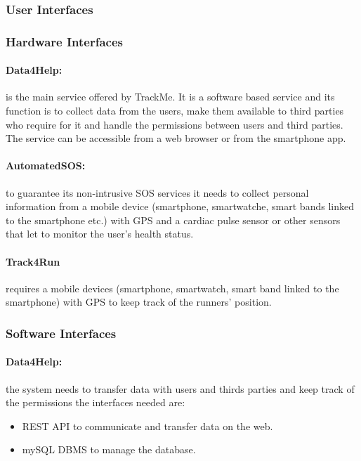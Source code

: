 \documentclass[a4paper]{article}
\begin{document}
    \subsubsection{User Interfaces}
    
    
    
    \subsubsection{Hardware Interfaces}
    
    \paragraph{Data4Help:} is the main service offered by TrackMe. It is a software based service and its function is to collect data from the users, make them available to third parties who require for it and handle the permissions between users and third parties. The service can be accessible from a web browser or from the smartphone app.
    
    \paragraph{AutomatedSOS:} to guarantee its non-intrusive SOS services it needs to collect personal information from a mobile device (smartphone, smartwatche, smart bands linked to the smartphone etc.) with GPS and a cardiac pulse sensor or other sensors that let to monitor the user's health status.
    
    \paragraph{Track4Run} requires a mobile devices (smartphone, smartwatch, smart band linked to the smartphone) with GPS to keep track of the runners' position.
    
    \subsubsection{Software Interfaces}
    
    \paragraph{Data4Help:} the system needs to transfer data with users and thirds parties and keep track of the permissions the interfaces needed are:
    \begin{itemize}
        \item REST API to communicate and transfer data on the web.
        \item mySQL DBMS to manage the database.
    \end{itemize}
    
\end{document}
